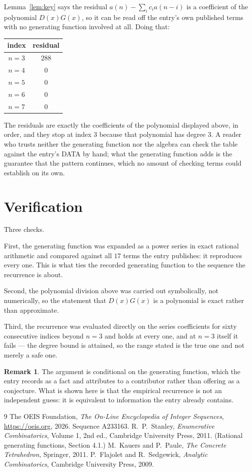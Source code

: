 \documentclass[11pt,a4paper]{article}
\theoremstyle{plain}
\theoremstyle{definition}
\newtheorem{remark}[theorem]{Remark}
\begin{document}
Lemma~\ref{lem:key} says the residual $a(n)-\sum_ic_ia(n-i)$ is a coefficient of the
polynomial $D(x)G(x)$, so it can be read off the entry's own published terms with no
generating function involved at all. Doing that:
\begin{center}
\begin{tabular}{cc}
index & residual \\ \hline
$n=3$ & $288$ \\
$n=4$ & $0$ \\
$n=5$ & $0$ \\
$n=6$ & $0$ \\
$n=7$ & $0$
\end{tabular}
\end{center}
The residuals are exactly the coefficients of the polynomial displayed above, in order, and
they stop at index $3$ because that polynomial has degree $3$. A reader who trusts
neither the generating function nor the algebra can check the table against the entry's DATA
by hand; what the generating function adds is the guarantee that the pattern continues, which
no amount of checking terms could establish on its own.

\section{Verification}

Three checks.

First, the generating function was expanded as a power series in exact rational arithmetic and
compared against all $17$ terms the entry publishes: it reproduces every one. This is
what ties the recorded generating function to the sequence the recurrence is about.

Second, the polynomial division above was carried out symbolically, not numerically, so the
statement that $D(x)G(x)$ is a polynomial is exact rather than approximate.

Third, the recurrence was evaluated directly on the series coefficients for sixty consecutive
indices beyond $n=3$ and holds at every one, and at $n=3$ itself it fails --- the
degree bound is attained, so the range stated is the true one and not merely a safe one.

\begin{remark}
The argument is conditional on the generating function, which the entry records as a fact and
attributes to a contributor rather than offering as a conjecture. What is shown here is that
the empirical recurrence is not an independent guess: it is equivalent to information the
entry already contains.
\end{remark}

\begin{thebibliography}{9}
 The OEIS Foundation, \emph{The On-Line Encyclopedia of Integer
Sequences}, \url{https://oeis.org}, 2026. Sequence A233163.
 R.~P.~Stanley, \emph{Enumerative Combinatorics}, Volume 1, 2nd ed.,
Cambridge University Press, 2011. (Rational generating functions, Section 4.1.)
 M.~Kauers and P.~Paule, \emph{The Concrete Tetrahedron}, Springer, 2011.
 P.~Flajolet and R.~Sedgewick, \emph{Analytic Combinatorics}, Cambridge
University Press, 2009.
\end{thebibliography}
\end{document}
